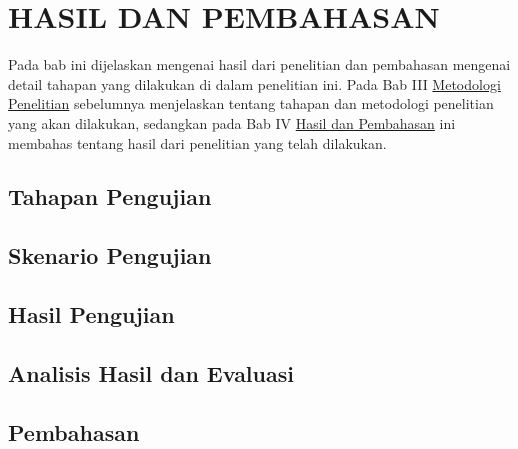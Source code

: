%
%
%
%
%

\chapter{HASIL DAN PEMBAHASAN}
\label{sec:hasil-dan-pembahasan}

Pada bab ini dijelaskan mengenai hasil dari penelitian dan pembahasan mengenai detail tahapan yang dilakukan di dalam penelitian ini. Pada Bab III \hyperref[sec:metodologi-penelitian]{Metodologi Penelitian} sebelumnya menjelaskan tentang tahapan dan metodologi penelitian yang akan dilakukan, sedangkan pada Bab IV \hyperref[sec:hasil-dan-pembahasan]{Hasil dan Pembahasan} ini membahas tentang hasil dari penelitian yang telah dilakukan.

\section{Tahapan Pengujian}

\blindtext

\section{Skenario Pengujian}

\blindtext

\section{Hasil Pengujian}

\blindtext

\section{Analisis Hasil dan Evaluasi}

\blindtext

\section{Pembahasan}

\blindtext
